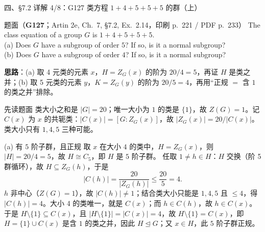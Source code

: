 \documentclass[aspectratio=169,10pt,fontset=none]{ctexbeamer}
\newcommand{\ex}[1]{\textcolor{accent}{\footnotesize\bfseries #1}}
\newcommand{\key}[1]{\textcolor{ink}{\bfseries #1}}
\begin{document}
\begin{frame}[t]{四、\S7.2 详解 4/8：G127 类方程 $1+4+5+5+5$ 的群（上）}
\label{ex:G127}
\scriptsize
\begin{block}{\footnotesize 题面（\ex{G127}；Artin 2e, Ch.~7, \S7.2, Ex.~2.14，印刷 p.~221 / PDF p.~233）}
The class equation of a group $G$ is $1+4+5+5+5$.\\
(a) Does $G$ have a subgroup of order $5$? If so, is it a normal subgroup?\\
(b) Does $G$ have a subgroup of order $4$? If so, is it a normal subgroup?
\end{block}
\key{思路}：(a) 取 4 元类的元素 $x$，$H=Z_G(x)$ 的阶为 $20/4=5$，再证 $H$ 是类之并；(b) 取 5 元类的元素 $y$，$K=Z_G(y)$ 的阶为 $20/5=4$，再用“正规 $=$ 含 $1$ 的类之并”排除。
\begin{block}{\footnotesize 先读题面}
类大小之和是 $|G|=20$；唯一大小为 $1$ 的类是 $\{1\}$，故 $Z(G)=1$。记 $C(x)$ 为 $x$ 的共轭类：$|C(x)|=[G:Z_G(x)]$，故 $|Z_G(x)|=20/|C(x)|$。类大小只有 $1,4,5$ 三种可能。
\end{block}
\begin{block}{\footnotesize (a) 有 $5$ 阶子群，且正规}
取 $x$ 在大小 $4$ 的类中，$H=Z_G(x)$，则 $|H|=20/4=5$，故 $H\cong C_5$，即 $H$ 是 $5$ 阶子群。
任取 $1\ne h\in H$：$H$ 交换（阶 5 群循环），故 $H\subseteq Z_G(h)$，于是
\[
|C(h)|=\frac{20}{|Z_G(h)|}\le\frac{20}{5}=4.
\]
$h$ 非中心（$Z(G)=1$），故 $|C(h)|\ne1$；结合类大小只能是 $1,4,5$ 且 $\le4$，得 $|C(h)|=4$。大小 4 的类唯一，就是 $C(x)$；而 $h\in C(h)$，故 $h\in C(x)$。于是 $H\setminus\{1\}\subseteq C(x)$，且 $|H\setminus\{1\}|=|C(x)|=4$，故 $H\setminus\{1\}=C(x)$，即 $H=\{1\}\cup C(x)$ 是含 $1$ 的类之并，因此 $H\trianglelefteq G$；又 $x\in H$，此 $5$ 阶子群正规。
\end{block}
\end{frame}
\end{document}
